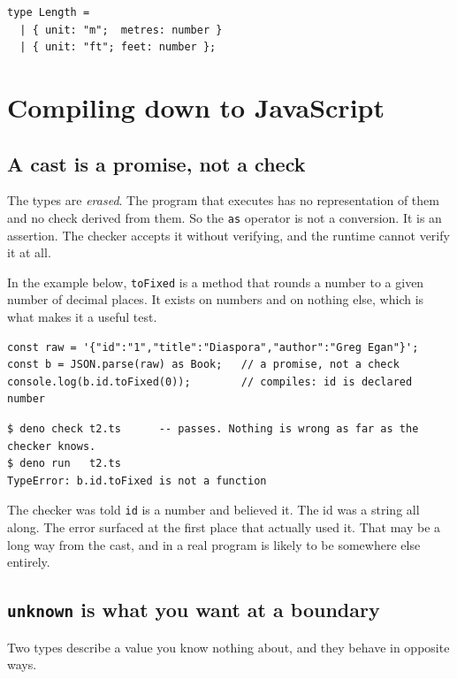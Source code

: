 \documentclass[11pt,a4paper]{article}
\begin{document}
\begin{lstlisting}[language=TS]
type Length =
  | { unit: "m";  metres: number }
  | { unit: "ft"; feet: number };
\end{lstlisting}

\newpage

\section{Compiling down to JavaScript}
\label{sec:unusual}

\subsection{A cast is a promise, not a check}

The types are \emph{erased}. The program that executes has no representation of them and no check
derived from them. So the \texttt{as} operator is not a conversion. It is an assertion. The checker
accepts it without verifying, and the runtime cannot verify it at all.

In the example below, \texttt{toFixed} is a method that rounds a number to a given number of
decimal places. It exists on numbers and on nothing else, which is what makes it a useful test.

\begin{lstlisting}[language=TS]
const raw = '{"id":"1","title":"Diaspora","author":"Greg Egan"}';
const b = JSON.parse(raw) as Book;   // a promise, not a check
console.log(b.id.toFixed(0));        // compiles: id is declared number
\end{lstlisting}

\begin{lstlisting}[language=SH]
$ deno check t2.ts      -- passes. Nothing is wrong as far as the checker knows.
$ deno run   t2.ts
TypeError: b.id.toFixed is not a function
\end{lstlisting}

The checker was told \texttt{id} is a number and believed it. The id was a string all along. The
error surfaced at the first place that actually used it. That may be a long way from the cast, and
in a real program is likely to be somewhere else entirely.

\subsection{\texttt{unknown} is what you want at a boundary}

Two types describe a value you know nothing about, and they behave in opposite ways.
\end{document}
